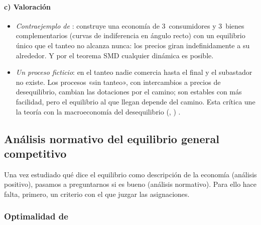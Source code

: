 \documentclass[11pt]{article}
\begin{document}
\paragraph{c) Valoración}

\begin{itemize}
\item \emph{Contraejemplo de }: \textcite{Scarf1960Examples} construye una economía de 3~consumidores y 3~bienes complementarios (curvas de indiferencia en ángulo recto) con un equilibrio único que el tanteo no alcanza nunca: los precios giran indefinidamente a su alrededor. Y por el teorema SMD cualquier dinámica es posible.
\item \emph{Un proceso ficticio}: en el tanteo nadie comercia hasta el final y el subastador no existe. Los procesos «sin tanteo», con intercambios a precios de desequilibrio, cambian las dotaciones por el camino; son estables con más facilidad, pero el equilibrio al que llegan depende del camino\nocite{Varian1992Microeconomic}. Esta crítica une la teoría con la macroeconomía del desequilibrio (, ) .
\end{itemize}

\subsection{Análisis normativo del equilibrio general competitivo}\label{sec:analisis-normativo-equilibrio}

Una vez estudiado qué dice el equilibrio como descripción de la economía (análisis positivo), pasamos a preguntarnos si es bueno (análisis normativo). Para ello hace falta, primero, un criterio con el que juzgar las asignaciones.

\subsubsection{Optimalidad de }\label{sec:optimalidad-pareto}
\end{document}
